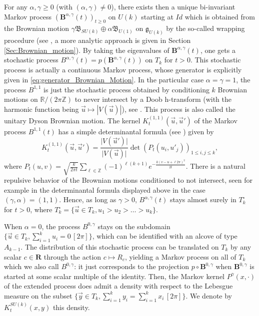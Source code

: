 \documentclass[10pt,11pt]{amsart}%
\begin{document}
For any $\alpha,\gamma\geq 0$ (with $(\alpha,\gamma)\not=0$), there exists then a unique bi-invariant Markov process $(\mathbf{B}^{\alpha,\gamma}(t))_{t\geq 0}$ on $U(k)$ starting at $Id$ which is obtained from the Brownian motion $\gamma \mathfrak{B}_{SU(k)}\oplus \alpha \mathfrak{B}_{U(1)}$ on $\mathfrak{g}_{U(k)}$ by the so-called wrapping procedure (see \cite[Section 1.4]{L}, a more analytic approach is given in Section \ref{Sec:Brownian_motion}). By taking the eigenvalues of $\mathbf{B}^{\alpha,\gamma}(t)$, one gets a stochastic process $B^{\alpha,\gamma}(t)=p\left(\mathbf{B}^{\alpha,\gamma}(t)\right)$ on $ T_{k}$ for $t>0$. This stochastic process is actually a continuous Markov process, whose generator is explicitly given in \eqref{eq:generator_Brownian_Motion}. In the particular case $\alpha=\gamma=1$, the process $B^{1,1}$ is just the stochastic process obtained by conditioning $k$ Brownian motions on $\mathbb{R}/(2\pi\mathbb{Z})$ to never intersect by a Doob h-transform (with the harmonic function being $\vec{u}\mapsto \left\vert V\left(\vec{u}\right)\right\vert$), see \cite{CL,HW}. This process is also called the unitary Dyson Brownian motion. The kernel $K^{(1,1)}_t(\vec{u},\vec{u}')$ of the Markov process $B^{1,1}(t)$ has a simple determinantal formula (see \cite[Proposition 1.1]{LW}) given by
$$K^{(1,1)}_t(\vec{u},\vec{u}')=\frac{\vert V(\vec{u}')\vert}{\vert V(\vec{u})\vert}\det(P_t(u_i,u'_j))_{1\leq i,j\leq k},$$
where $P_t(u,v)=\sqrt{\frac{k}{2\pi t}}\sum_{\ell\in \mathbb{Z}}(-1)^{\ell(k+1)}e^{-\frac{k(v-u+\ell 2\pi)^2}{2t}}$.  There is a natural repulsive behavior of the Brownian motions conditioned to not intersect, seen for example in the determinantal formula displayed above in the case $(\gamma,\alpha)=(1,1)$. Hence, as long as $\gamma>0$, $B^{\alpha,\gamma}(t)$ stays almost surely in $ T_{k}^{\circ}$ for $t>0$, where $T_k^{\circ}=\{\vec{u}\in T_k, u_1>u_2>\dots>u_k\}$.

When $\alpha=0$, the process $B^{0,\gamma}$ stays on the subdomain $\{\vec{u}\in  T_{k}, \sum_{i=1}^ku_i=0\,[2\pi]\}$, which can be identified with an alcove of type $A_{k-1}$. The distribution of this stochastic process can be translated on $T_k$ by any scalar $c\in\textbf{R}$ through the action $c\mapsto R_c$, yielding a Markov process on all of $T_k$ which we also call $B^{0,\gamma}$: it just corresponds to the projection $p\circ\mathbf{B}^{0,\gamma}$  when $\mathbf{B}^{0,\gamma}$ is started at some scalar multiple of the identity. Then, the Markov kernel $P^{\gamma}(x,\cdot)$ of the extended process does admit a density with respect to the Lebesgue measure on the subset $\{\vec{y}\in  T_{k}, \sum_{i=1}^ky_i=\sum_{i=1}^kx_i\,[2\pi]\}$. We denote by $K^{SU(k)}_{t}(x,y)$ this density. 
\end{document}
